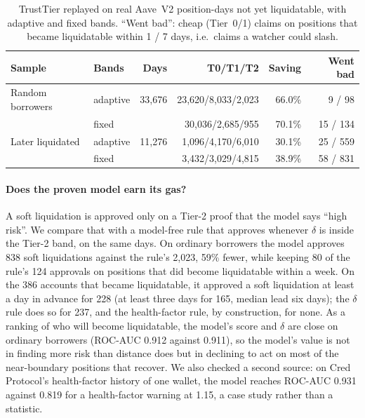\documentclass[sigconf,nonacm]{acmart}
\begin{document}
\begin{table}[t]
  \caption{TrustTier replayed on real Aave~V2 position-days not yet liquidatable, with adaptive and fixed bands. ``Went bad'': cheap (Tier~0/1) claims on positions that became liquidatable within 1 / 7 days, i.e.\ claims a watcher could slash.}
  \label{tab:aave}
  \footnotesize
  \setlength{\tabcolsep}{2.5pt}
  \begin{tabular}{@{}llrrrr@{}}
    \toprule
    \textbf{Sample} & \textbf{Bands} & \textbf{Days} & \textbf{T0/T1/T2} & \textbf{Saving} & \textbf{Went bad} \\
    \midrule
    Random borrowers & adaptive & 33,676 & 23,620/8,033/2,023 & 66.0\% & 9 / 98 \\
                     & fixed    &        & 30,036/2,685/955 & 70.1\% & 15 / 134 \\
    Later liquidated & adaptive & 11,276 & 1,096/4,170/6,010 & 30.1\% & 25 / 559 \\
                     & fixed    &        & 3,432/3,029/4,815 & 38.9\% & 58 / 831 \\
    \bottomrule
  \end{tabular}
\end{table}

\paragraph{Does the proven model earn its gas?} A soft liquidation is approved only on a Tier-2 proof that the model says ``high risk''. We compare that with a model-free rule that approves whenever $\delta$ is inside the Tier-2 band, on the same days. On ordinary borrowers the model approves 838 soft liquidations against the rule's 2,023, 59\% fewer, while keeping 80 of the rule's 124 approvals on positions that did become liquidatable within a week. On the 386 accounts that became liquidatable, it approved a soft liquidation at least a day in advance for 228 (at least three days for 165, median lead six days); the $\delta$ rule does so for 237, and the health-factor rule, by construction, for none. As a ranking of who will become liquidatable, the model's score and $\delta$ are close on ordinary borrowers (ROC-AUC 0.912 against 0.911), so the model's value is not in finding more risk than distance does but in declining to act on most of the near-boundary positions that recover. We also checked a second source: on Cred Protocol's health-factor history of one wallet, the model reaches ROC-AUC 0.931 against 0.819 for a health-factor warning at 1.15, a case study rather than a statistic.
\end{document}
